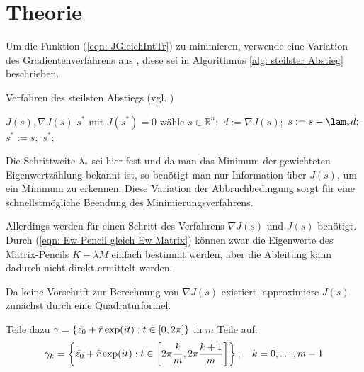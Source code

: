 \documentclass[a4paper,12pt]{report}
\newcommand{\R}{\mathbb R}
\newcommand{\1}{\mathds{1}}
\theoremstyle{plain} %
\theoremstyle{definition} %
\theoremstyle{remark}
\begin{document}
      \section{Theorie}
            Um die Funktion (\ref{eqn: JGleichIntTr}) zu minimieren, verwende eine Variation des Gradientenverfahrens aus \cite[S. 285]{optimierungBurkhard}, diese sei in Algorithmus \ref{alg: steilster Abstieg} beschrieben.
            \begin{algorithm}[h!t]
                  \caption{Verfahren des steilsten Abstiegs (vgl. \cite[S. 285]{optimierungBurkhard})}
                  \label{alg: steilster Abstieg}

                  \begin{algorithmic}
                        \Require $J(s), \nabla J(s)$
                        \Ensure $s^*$ mit $J(s^*)=0$
                        \State wähle $s\in \R^n;$
                        \Repeat
                              \State $d:=\nabla J(s);$
                              \State $s:=s-\lam_*d;$
                        \State $s^*:=s;$
                        \Return $s^*;$
                  \end{algorithmic}
            \end{algorithm}

            Die Schrittweite $\lambda_*$ sei hier fest und da man das Minimum der gewichteten Eigenwertzählung bekannt ist,
            so benötigt man nur Information über $J(s)$, um ein Minimum zu erkennen.
            Diese Variation der Abbruchbedingung sorgt für eine schnellstmögliche Beendung des Minimierungsverfahrens.

            Allerdings werden für einen Schritt des Verfahrens $\nabla J(s)$ und $J(s)$ benötigt.
            Durch (\ref{eqn: Ew Pencil gleich Ew Matrix}) können zwar die Eigenwerte des Matrix-Pencils $K-\lambda M$ einfach bestimmt werden, aber die Ableitung kann dadurch nicht direkt ermittelt werden.

            Da keine Vorschrift zur Berechnung von $\nabla J(s)$ existiert, approximiere $J(s)$ zunächst durch eine Quadraturformel.

            Teile dazu $\gamma = \{\Tilde{z_0}+\Tilde r\exp(it): t\in [0,2\pi]\}$ in $m$ Teile auf:
            \begin{equation}
                  \label{def: gamma_k}
                  \gamma_k = \left\{\Tilde{z_0}+\Tilde r\exp(it): t\in \left[ 2\pi \frac k m, 2\pi \frac {k+1} m\right]\right\},\quad k=0,\dots,m-1
            \end{equation}
\end{document}
